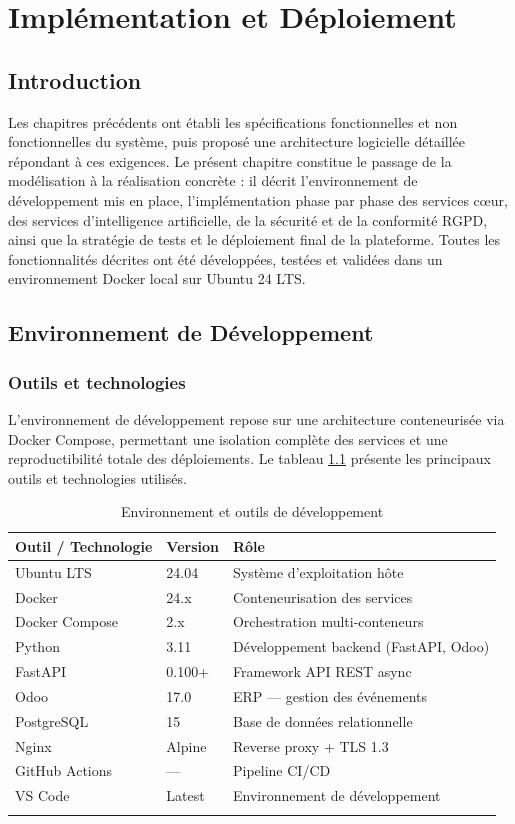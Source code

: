 \chapter{Implémentation et Déploiement}

\section*{Introduction}
Les chapitres précédents ont établi les spécifications fonctionnelles et non fonctionnelles du système, puis proposé une architecture logicielle détaillée répondant à ces exigences. Le présent chapitre constitue le passage de la modélisation à la réalisation concrète : il décrit l'environnement de développement mis en place, l'implémentation phase par phase des services c\oe{}ur, des services d'intelligence artificielle, de la sécurité et de la conformité RGPD, ainsi que la stratégie de tests et le déploiement final de la plateforme. Toutes les fonctionnalités décrites ont été développées, testées et validées dans un environnement Docker local sur Ubuntu 24 LTS.

\section{Environnement de Développement}

\subsection{Outils et technologies}
L'environnement de développement repose sur une architecture conteneurisée via Docker Compose, permettant une isolation complète des services et une reproductibilité totale des déploiements. Le tableau \ref{tab:dev_env} présente les principaux outils et technologies utilisés.

\begin{longtable}{|m{4cm}|m{3cm}|m{5.5cm}|}
\hline
\textbf{Outil / Technologie} & \textbf{Version} & \textbf{Rôle} \\
\hline
\endhead
\endfoot
\endlastfoot
\hline
Ubuntu LTS & 24.04 & Système d'exploitation hôte \\
\hline
Docker & 24.x & Conteneurisation des services \\
\hline
Docker Compose & 2.x & Orchestration multi-conteneurs \\
\hline
Python & 3.11 & Développement backend (FastAPI, Odoo) \\
\hline
FastAPI & 0.100+ & Framework API REST async \\
\hline
Odoo & 17.0 & ERP — gestion des événements \\
\hline
PostgreSQL & 15 & Base de données relationnelle \\
\hline
Nginx & Alpine & Reverse proxy + TLS 1.3 \\
\hline
GitHub Actions & — & Pipeline CI/CD \\
\hline
VS Code & Latest & Environnement de développement \\
\hline
\captionsetup{justification=centering,margin=2cm}
\caption{Environnement et outils de développement}
\label{tab:dev_env}
\end{longtable}


